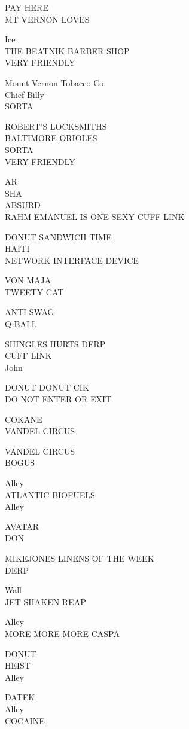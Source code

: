 \documentclass[10pt,letterpaper]{article}
\begin{document}
PAY HERE\\
MT VERNON LOVES

Ice\\
THE BEATNIK BARBER SHOP\\
VERY FRIENDLY

Mount Vernon Tobacco Co.\\
Chief Billy\\
SORTA

ROBERT'S LOCKSMITHS\\
BALTIMORE ORIOLES\\
SORTA\\
VERY FRIENDLY

AR\\
SHA\\
ABSURD\\
RAHM EMANUEL IS ONE SEXY CUFF LINK

DONUT SANDWICH TIME\\
HAITI\\
NETWORK INTERFACE DEVICE

VON MAJA\\
TWEETY CAT

ANTI{-}SWAG\\
Q{-}BALL

SHINGLES HURTS DERP\\
CUFF LINK\\
John

DONUT DONUT CIK\\
DO NOT ENTER OR EXIT

COKANE\\
VANDEL CIRCUS

VANDEL CIRCUS\\
BOGUS

Alley\\
ATLANTIC BIOFUELS\\
Alley

AVATAR\\
DON

MIKEJONES LINENS OF THE WEEK\\
DERP

Wall\\
JET SHAKEN REAP

Alley\\
MORE MORE MORE CASPA

DONUT\\
HEIST\\
Alley

DATEK\\
Alley\\
COCAINE
\end{document}
